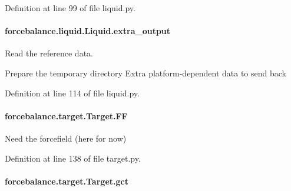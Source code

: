 Definition at line 99 of file liquid.\-py.

\hypertarget{classforcebalance_1_1liquid_1_1Liquid_a646aeaaff46cf6a8e97f5cd5016a222f}{
\paragraph[{extra\-\_\-output}]{\setlength{\rightskip}{0pt plus 5cm}forcebalance.\-liquid.\-Liquid.\-extra\-\_\-output}}\label{classforcebalance_1_1liquid_1_1Liquid_a646aeaaff46cf6a8e97f5cd5016a222f}


Read the reference data. 

Prepare the temporary directory Extra platform-\/dependent data to send back 

Definition at line 114 of file liquid.\-py.

\hypertarget{classforcebalance_1_1target_1_1Target_a38a37919783141ea37fdcf8b00ce0aaf}{
\paragraph[{F\-F}]{\setlength{\rightskip}{0pt plus 5cm}forcebalance.\-target.\-Target.\-F\-F\hspace{0.3cm}{\ttfamily [inherited]}}}\label{classforcebalance_1_1target_1_1Target_a38a37919783141ea37fdcf8b00ce0aaf}


Need the forcefield (here for now) 



Definition at line 138 of file target.\-py.

\hypertarget{classforcebalance_1_1target_1_1Target_aa625ac88c6744eb14ef281d9496d0dbb}{
\paragraph[{gct}]{\setlength{\rightskip}{0pt plus 5cm}forcebalance.\-target.\-Target.\-gct\hspace{0.3cm}{\ttfamily [inherited]}}}\label{classforcebalance_1_1target_1_1Target_aa625ac88c6744eb14ef281d9496d0dbb}


